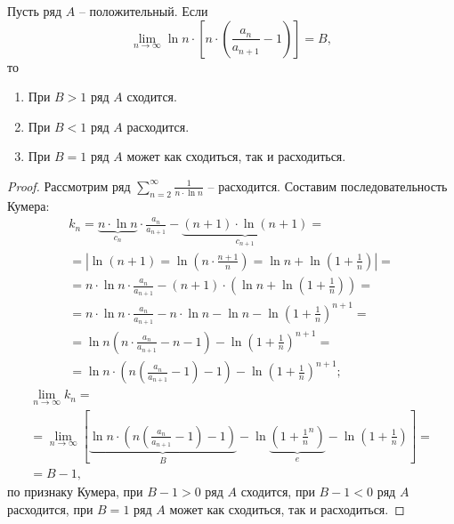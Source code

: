\newpage

\begin{theorem}
    Пусть ряд $A$ -- положительный. Если
    \[
        \underset{n\rightarrow\infty}{\lim} \ln n \cdot \left[n \cdot (\frac{a_n}{a_{n+1}} - 1)\right] = B,
    \]
    то
    \begin{enumerate}
        \item При $B > 1$ ряд $A$ сходится.
        \item При $B < 1$ ряд $A$ расходится.
        \item При $B = 1$ ряд $A$ может как сходиться, так и расходиться.
    \end{enumerate}
\end{theorem}

\begin{proof}
    Рассмотрим ряд $\sum_{n=2}^{\infty} \frac{1}{n\cdot \ln n}$ -- расходится. Составим последовательность Кумера:
    \begin{multline*}
        k_n = \underbrace{n \cdot \ln n}_{c_n} \cdot \frac{a_n}{a_{n+1}} - \underbrace{(n+1) \cdot \ln(n+1)}_{c_{n+1}} = \\
        = \left| \ln(n+1) = \ln\left(n\cdot \frac{n+1}{n}\right) = \ln n + \ln\left(1 + \frac{1}{n}\right) \right| = \\
        = n \cdot \ln n \cdot \frac{a_n}{a_{n+1}} - (n+1)\cdot \left(\ln n + \ln\left(1 + \frac{1}{n}\right)\right) = \\
        = n \cdot \ln n \cdot \frac{a_n}{a_{n+1}} - n\cdot \ln n - \ln n - \ln\left(1 + \frac{1}{n}\right)^{n+1} = \\
        = \ln n \left(n \cdot \frac{a_n}{a_{n+1}} - n - 1\right) - \ln \left(1 + \frac{1}{n}\right)^{n+1} = \\
        = \ln n \cdot \left(n\left(\frac{a_n}{a_{n+1}} - 1\right) - 1\right) - \ln\left(1+\frac{1}{n}\right)^{n+1};
    \end{multline*}
    \begin{multline*}
        \underset{n\rightarrow\infty}{\lim} k_n = \\
        = \underset{n\rightarrow\infty}{\lim}\left[\underbrace{\ln n \cdot \left(n\left(\frac{a_n}{a_{n+1}} - 1\right) - 1\right)}_{B} - \ln\underbrace{\left(1 + \frac{1}{n}^n\right)}_{e} - \ln\left(1 + \frac{1}{n}\right)\right] = \\
        = B - 1,
    \end{multline*}
    по признаку Кумера, при $B-1 > 0$ ряд $A$ сходится, при $B-1 < 0$ ряд $A$ расходится, при $B=1$ ряд $A$ может как сходиться, так и расходиться.
\end{proof}

